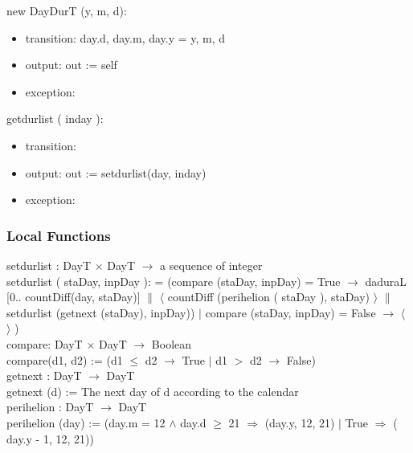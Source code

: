 \documentclass[12pt, titlepage]{article}
\begin{document}
\noindent  new DayDurT (y, m, d):
\begin{itemize}
\item transition:  day.d, day.m, day.y = y, m, d\\

\item output: out := self
\item exception: 
\end{itemize}

\noindent  getdurlist ( inday ):
\begin{itemize}
\item transition: 
\item output: out := setdurlist(day, inday)
\item exception:
\end{itemize}


\subsubsection{Local Functions}
setdurlist : DayT $\times$ DayT $\rightarrow $ a sequence of integer\\
setdurlist ( staDay, inpDay ): = (compare (staDay, inpDay) = True $\rightarrow $ daduraL [0.. countDiff(day, staDay)] $\|$ $\langle$ countDiff (perihelion ( staDay ), staDay) $\rangle$ $\|$ setdurlist (getnext (staDay), inpDay)) $|$ compare (staDay, inpDay) = False $\rightarrow $ $\langle$ $\rangle$ )\\


compare: DayT $\times$ DayT $\rightarrow $ Boolean\\
compare(d1, d2) := (d1 $\leq$ d2 $\rightarrow $ True $|$ d1 $>$ d2 $\rightarrow $ False)\\


getnext : DayT $\rightarrow $ DayT\\
getnext (d) := The next day of d according to the calendar\\

perihelion : DayT $\rightarrow $ DayT\\
perihelion (day) :=  (day.m = 12 $	\wedge$ day.d $\geq	$ 21 $\Rightarrow$  (day.y, 12, 21) $|$ True $\Rightarrow$ ( day.y - 1, 12, 21))\\
\end{document}
